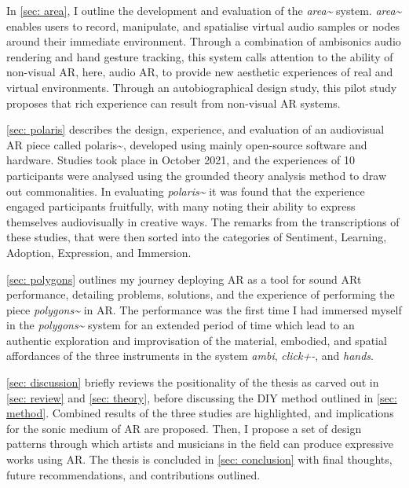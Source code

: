 In \autoref{sec: area}, I outline the development and evaluation of the \textit{area\textasciitilde{}} system. \textit{area\textasciitilde{}} enables users to record, manipulate, and spatialise virtual audio samples or nodes around their immediate environment. Through a combination of ambisonics audio rendering and hand gesture tracking, this system calls attention to the ability of non-visual AR, here, audio AR, to provide new aesthetic experiences of real and virtual environments. Through an autobiographical design study, this pilot study proposes that rich experience can result from non-visual AR systems. 

\autoref{sec: polaris} describes the design, experience, and evaluation of an audiovisual AR piece called {polaris\textasciitilde{}}, developed using mainly open-source software and hardware. Studies took place in October 2021, and the experiences of 10 participants were analysed using the grounded theory analysis method to draw out commonalities. In evaluating \textit{polaris\textasciitilde{}} it was found that the experience engaged participants fruitfully, with many noting their ability to express themselves audiovisually in creative ways. The remarks from the transcriptions of these studies, that were then sorted into the categories of Sentiment, Learning, Adoption, Expression, and Immersion. 

\autoref{sec: polygons} outlines my journey deploying AR as a tool for sound ARt performance, detailing problems, solutions, and the experience of performing the piece \textit{polygons\textasciitilde{}} in AR. The performance was the first time I had immersed myself in the \textit{polygons\textasciitilde{}} system for an extended period of time which lead to an authentic exploration and improvisation of the material, embodied, and spatial affordances of the three instruments in the system \textit{ambi}, \textit{click+-}, and \textit{hands}.

\autoref{sec: discussion} briefly reviews the positionality of the thesis as carved out in \autoref{sec: review} and \autoref{sec: theory}, before discussing the DIY method outlined in \autoref{sec: method}. Combined results of the three studies are highlighted, and implications for the sonic medium of AR are proposed. Then, I propose a set of design patterns through which artists and musicians in the field can produce expressive works using AR. The thesis is concluded in \autoref{sec: conclusion} with final thoughts, future recommendations, and contributions outlined.

